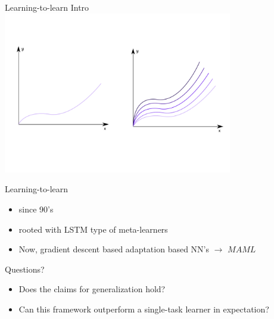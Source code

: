 \documentclass[aspectratio=169]{beamer}
\begin{document}
\begin{frame}{Learning-to-learn Intro}
  \centering
  \includegraphics[width=0.75\textwidth]{singlevsmeta}
\end{frame}

\begin{frame}{Learning-to-learn}
  \begin{itemize}
    \item since 90's 
    \item rooted with LSTM type of meta-learners 
    \item Now, gradient descent based adaptation based NN's $\to$ $MAML$
  \end{itemize}
\end{frame}


\begin{frame}{Questions?}
  \begin{itemize}
      \item Does the claims for generalization hold?
      \item Can this framework outperform a single-task learner in expectation?
  \end{itemize}
\end{frame}
\end{document}
